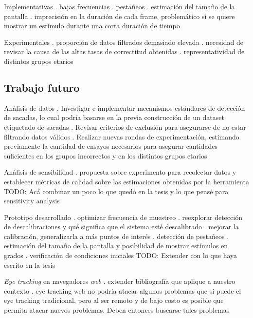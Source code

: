 \documentclass[aspectratio=169]{beamer}
\begin{document}
\begin{frame}{Implementativas}
. bajas frecuencias
. pestañeos
. estimación del tamaño de la pantalla
. imprecisión en la duración de cada frame, problemático si se quiere mostrar
  un estímulo durante una corta duración de tiempo
\end{frame}

\begin{frame}{Experimentales}
. proporción de datos filtrados demasiado elevada
. necesidad de revisar la causa de las altas tasas de correctitud obtenidas
. representatividad de distintos grupos etarios
\end{frame}

\subsection{Trabajo futuro}

\begin{frame}{Análisis de datos}
. Investigar e implementar mecanismos estándares de detección de sacadas, lo
  cual podría basarse en la previa construcción de un dataset etiquetado de
  sacadas
. Revisar criterios de exclusión para asegurarse de no estar filtrando datos
  válidos
. Realizar nuevas rondas de experimentación, estimando previamente la cantidad
  de ensayos necesarios para asegurar cantidades suficientes en los grupos
  incorrectos y en los distintos grupos etarios
\end{frame}

\begin{frame}{Análisis de sensibilidad}
. propuesta sobre experimento para recolectar datos y establecer métricas de
  calidad sobre las estimaciones obtenidas por la herramienta
TODO: Acá combinar un poco lo que quedó en la tesis y lo que pensé para
      sensitivity analysis
\end{frame}

\begin{frame}{Prototipo desarrollado}
. optimizar frecuencia de muestreo
. reexplorar detección de descalibraciones y qué significa que el sistema esté
  descalibrado
. mejorar la calibración, generalizarla a más puntos de interés
. detección de pestañeos
. estimación del tamaño de la pantalla y posibilidad de mostrar estímulos en
  grados
. verificación de condiciones iniciales
TODO: Extender con lo que haya escrito en la tesis
\end{frame}

\begin{frame}{\textit{Eye tracking} en navegadores \textit{web}}
. extender bibliografía que aplique a nuestro contexto
. eye tracking web no podría atacar algunos problemas que sí puede el eye
  tracking tradicional, pero al ser remoto y de bajo costo es posible que
  permita atacar nuevos problemas. Deben entonces buscarse tales problemas
\end{frame}
\end{document}
